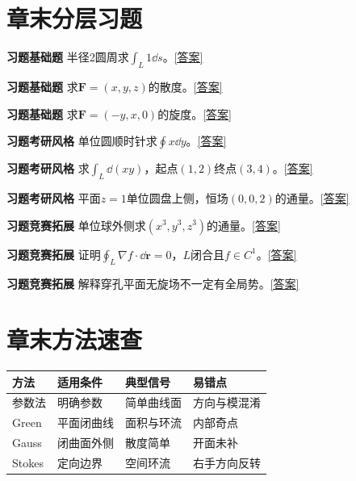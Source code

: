 





\section*{章末分层习题}
\label{q:8:1}\par\noindent\textbf{习题\theexercise\quad 基础题} 半径2圆周求$\int_L1\dd s$。\quad\hyperref[a:8:1]{[答案]}\par
{}\label{q:8:2}\par\noindent\textbf{习题\theexercise\quad 基础题} 求$\bm F=(x,y,z)$的散度。\quad\hyperref[a:8:2]{[答案]}\par
{}\label{q:8:3}\par\noindent\textbf{习题\theexercise\quad 基础题} 求$\bm F=(-y,x,0)$的旋度。\quad\hyperref[a:8:3]{[答案]}\par
{}\label{q:8:4}\par\noindent\textbf{习题\theexercise\quad 考研风格} 单位圆顺时针求$\oint x\dd y$。\quad\hyperref[a:8:4]{[答案]}\par
{}\label{q:8:5}\par\noindent\textbf{习题\theexercise\quad 考研风格} 求$\int_L\dd(xy)$，起点$(1,2)$终点$(3,4)$。\quad\hyperref[a:8:5]{[答案]}\par
{}\label{q:8:6}\par\noindent\textbf{习题\theexercise\quad 考研风格} 平面$z=1$单位圆盘上侧，恒场$(0,0,2)$的通量。\quad\hyperref[a:8:6]{[答案]}\par
{}\label{q:8:7}\par\noindent\textbf{习题\theexercise\quad 竞赛拓展} 单位球外侧求$(x^3,y^3,z^3)$的通量。\quad\hyperref[a:8:7]{[答案]}\par
{}\label{q:8:8}\par\noindent\textbf{习题\theexercise\quad 竞赛拓展} 证明$\oint_L\nabla f\cdot\dd\bm r=0$，$L$闭合且$f\in C^1$。\quad\hyperref[a:8:8]{[答案]}\par
{}\label{q:8:9}\par\noindent\textbf{习题\theexercise\quad 竞赛拓展} 解释穿孔平面无旋场不一定有全局势。\quad\hyperref[a:8:9]{[答案]}\par
\section*{章末方法速查}
\par\noindent\begin{tabularx}{\textwidth}{p{23mm}XXX}\toprule 方法&适用条件&典型信号&易错点\\\midrule
参数法&明确参数&简单曲线面&方向与模混淆\\Green&平面闭曲线&面积与环流&内部奇点\\Gauss&闭曲面外侧&散度简单&开面未补\\Stokes&定向边界&空间环流&右手方向反转\\
\bottomrule\end{tabularx}
